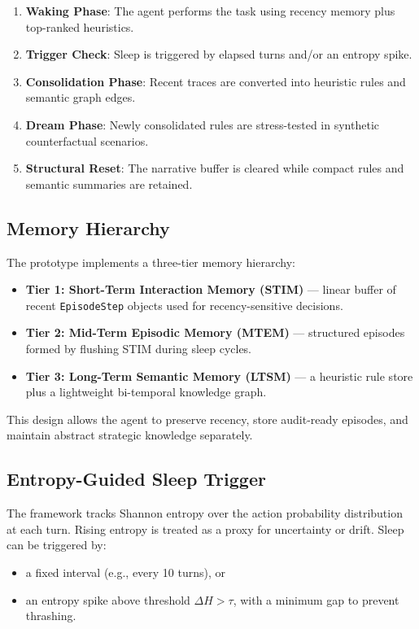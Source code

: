 \documentclass{article}
\begin{document}
\begin{enumerate}[leftmargin=1.25em]
\item \textbf{Waking Phase}: The agent performs the task using recency memory plus top-ranked heuristics.
\item \textbf{Trigger Check}: Sleep is triggered by elapsed turns and/or an entropy spike.
\item \textbf{Consolidation Phase}: Recent traces are converted into heuristic rules and semantic graph edges.
\item \textbf{Dream Phase}: Newly consolidated rules are stress-tested in synthetic counterfactual scenarios.
\item \textbf{Structural Reset}: The narrative buffer is cleared while compact rules and semantic summaries are retained.
\end{enumerate}

\subsection{Memory Hierarchy}

The prototype implements a three-tier memory hierarchy:

\begin{itemize}[leftmargin=1.25em]
\item \textbf{Tier 1: Short-Term Interaction Memory (STIM)} --- linear buffer of recent \texttt{EpisodeStep} objects used for recency-sensitive decisions.
\item \textbf{Tier 2: Mid-Term Episodic Memory (MTEM)} --- structured episodes formed by flushing STIM during sleep cycles.
\item \textbf{Tier 3: Long-Term Semantic Memory (LTSM)} --- a heuristic rule store plus a lightweight bi-temporal knowledge graph.
\end{itemize}

This design allows the agent to preserve recency, store audit-ready episodes, and maintain abstract strategic knowledge separately.

\subsection{Entropy-Guided Sleep Trigger}

The framework tracks Shannon entropy over the action probability distribution at each turn. Rising entropy is treated as a proxy for uncertainty or drift. Sleep can be triggered by:

\begin{itemize}[leftmargin=1.25em]
\item a fixed interval (e.g., every 10 turns), or
\item an entropy spike above threshold $\Delta H > \tau$, with a minimum gap to prevent thrashing.
\end{itemize}
\end{document}
